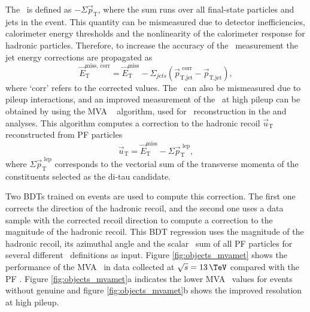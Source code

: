 The \MET~is defined as $-\Sigma \vec{p}_{\text{T}}$, where
the sum runs over all final-state particles and jets in the event. This quantity
can be mismeasured due to detector inefficiencies, calorimeter energy thresholds and
the nonlinearity of the calorimeter
response for hadronic particles.
Therefore, to increase the accuracy of the \MET~measurement the jet energy corrections are propagated as
\begin{equation}\label{eqn:objects_met_corr}
\vec{E}_{\text{T}}^{\text{miss, corr}} = \vec{E}_{\text{T}}^{\text{miss}} - \Sigma_{jets} (\vec{p}_{\text{T,jet}}^{\text{  corr}} - \vec{p}_{\text{T,jet}}),
\end{equation}
where `corr' refers to the corrected values.
The \MET~can also be mismeasured due to pileup interactions, and an improved
measurement of the \MET~at high pileup can be obtained by using the MVA \MET~
algorithm, used for \MET~reconstruction in the \Htohhtobbtautau and \AHtotautau analyses.
This algorithm computes a correction to the hadronic
recoil $\vec{u}_{\text{T}}$ reconstructed from \ac{PF} particles
\begin{equation}\label{eqn:objects_met_recoil}
\vec{u}_{\text{T}} = \vec{E}_{\text{T}}^{\text{miss}} - \Sigma \vec{p}_{\text{T}}^{\text{  lep}},
\end{equation}
where $\Sigma \vec{p}_{\text{T}}^{\text{  lep}}$ corresponds to the vectorial sum of the transverse momenta of the
constituents selected as the di-tau candidate.

Two \acp{BDT} trained on \Zmm events are used to compute this correction.
The first one corrects the direction of the hadronic recoil, and the second
one uses a data sample with the corrected recoil direction to compute a correction
to the magnitude of the hadronic recoil. This \ac{BDT} regression uses the magnitude of the hadronic
recoil, its azimuthal angle and the scalar \pT~sum of all \ac{PF} particles for several 
different \MET~definitions \cite{cms-met-run1} as input. Figure \ref{fig:objects_mvamet} shows
the performance of the MVA \MET~in data collected at $\sqrt{s}=13\,\TeV$ compared with 
the \ac{PF} \MET. Figure \ref{fig:objects_mvamet}a indicates the lower MVA \MET~values for events without genuine
\MET and figure \ref{fig:objects_mvamet}b shows the improved resolution at high pileup.

